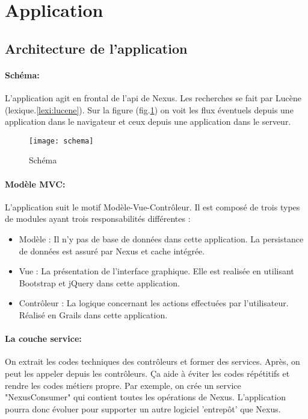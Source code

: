 \section{Application}

\subsection{Architecture de l'application}

\paragraph{Schéma:}
L'application agit en frontal de l'api de Nexus. Les recherches se fait par Lucène (lexique.\ref{lexi:lucene}).
Sur la figure (fig.\ref{fig:schema}) on voit les flux éventuels depuis une application dans le navigateur et ceux depuis une application dans le serveur.

\begin{figure}[ht]
 \centering
 \texttt{[image: schema]}
 \caption{Schéma}
 \label{fig:schema}
\end{figure}

\paragraph{Modèle MVC:}
L'application suit le motif Modèle-Vue-Contrôleur.
Il est composé de trois types de modules ayant trois responsabilités différentes :
\begin{itemize}
 \item Modèle : Il n'y pas de base de données dans cette application.
       La persistance de données est assuré par Nexus et cache intégrée.
 \item Vue : La présentation de l'interface graphique.
       Elle est realisée en utilisant Bootstrap et jQuery dans cette application.
 \item Contrôleur : La logique concernant les actions effectuées par l'utilisateur.
       Réalisé en Grails dans cette application.
\end{itemize}

\paragraph{La couche service:}
On extrait les codes techniques des contrôleurs et former des services. Après, on peut les appeler depuis les contrôleurs.
Ça aide à éviter les codes répétitifs et rendre les codes métiers propre.
Par exemple, on crée un service "NexusConsumer" qui contient toutes les opérations de Nexus.
L'application pourra donc évoluer pour supporter un autre logiciel 'entrepôt' que Nexus.


